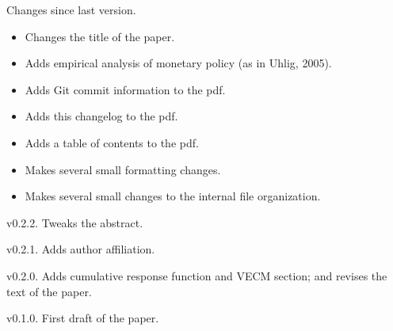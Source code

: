 \begin{description}
\item{Changes since last version.}
  \begin{itemize}[noitemsep]
  \item Changes the title of the paper.
  \item Adds empirical analysis of monetary policy (as in Uhlig, 2005).
  \item Adds Git commit information to the pdf.
  \item Adds this changelog to the pdf.
  \item Adds a table of contents to the pdf.
  \item Makes several small formatting changes.
  \item Makes several small changes to the internal file organization.
  \end{itemize}

\item{v0.2.2.} Tweaks the abstract.

\item{v0.2.1.} Adds author affiliation.

\item{v0.2.0.} Adds cumulative response function and VECM section; and
  revises the text of the paper.

\item{v0.1.0.} First draft of the paper.
\end{description}

